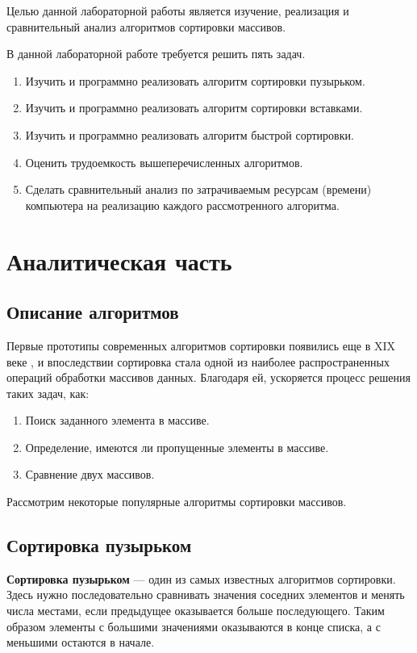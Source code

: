 \documentclass[12pt]{report}
\begin{document}
	Целью данной лабораторной работы является изучение, реализация и сравнительный анализ алгоритмов сортировки массивов. 

В данной лабораторной работе требуется решить пять задач.
\begin{enumerate}
\item Изучить и программно реализовать алгоритм сортировки пузырьком.
\item Изучить и программно реализовать алгоритм сортировки вставками.
\item Изучить и программно реализовать алгоритм быстрой сортировки.
\item Оценить трудоемкость вышеперечисленных алгоритмов.
\item Сделать сравнительный анализ по затрачиваемым ресурсам (времени) компьютера на реализацию каждого рассмотренного алгоритма.
\end{enumerate}


\chapter{Аналитическая часть}
 
 \section{Описание алгоритмов}
 
 Первые прототипы современных алгоритмов сортировки появились еще в XIX веке \cite{bib5}, и впоследствии сортировка стала одной из наиболее распространенных операций обработки массивов данных. Благодаря ей, ускоряется процесс решения таких задач, как:
\begin{enumerate}
\item Поиск заданного элемента в массиве.
\item Определение, имеются ли пропущенные элементы в массиве.
\item Сравнение двух массивов.
\end{enumerate}

Рассмотрим некоторые популярные алгоритмы сортировки массивов.

 \section{Сортировка пузырьком}

\textbf{Сортировка пузырьком} — один из самых известных алгоритмов сортировки. Здесь нужно последовательно сравнивать значения соседних элементов и менять числа местами, если предыдущее оказывается больше последующего. Таким образом элементы с большими значениями оказываются в конце списка, а с меньшими остаются в начале.
\end{document}
